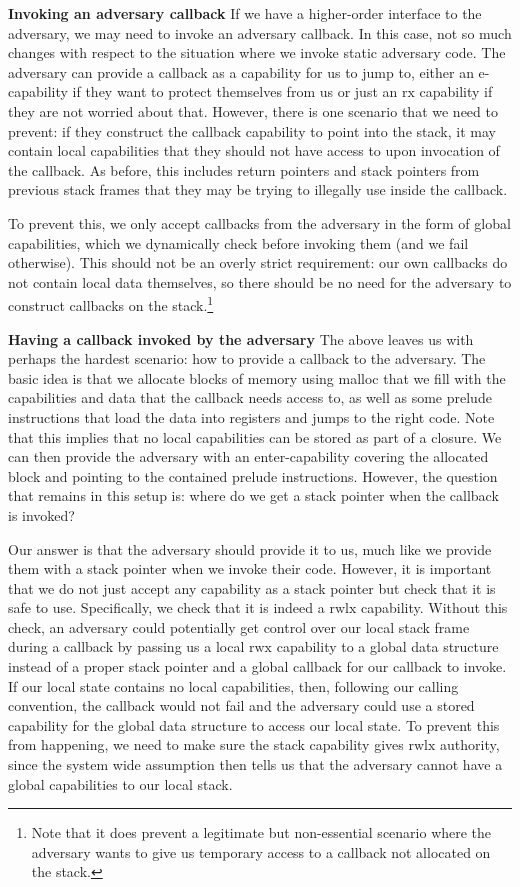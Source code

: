 \documentclass[compsoc,conference,letterpaper,fleqn]{IEEEtran}
\newcommand{\plainperm}[1]{\mathrm{#1}}
\newcommand{\exec}{\plainperm{rx}}
\newcommand{\entry}{\plainperm{e}}
\newcommand{\rwx}{\plainperm{rwx}}
\newcommand{\rwlx}{\plainperm{rwlx}}
\begin{document}
\textbf{Invoking an adversary callback} If we have a higher-order interface to
the adversary, we may need to invoke an adversary callback. In this case, not so
much changes with respect to the situation where we invoke static adversary
code. The adversary can provide a callback as a capability for us to jump to,
either an $\entry$-capability if they want to protect themselves from us or just
an $\exec$ capability if they are not worried about that. However, there is one
scenario that we need to prevent: if they construct the callback capability to
point into the stack, it may contain local capabilities that they should not
have access to upon invocation of the callback. As before, this includes return
pointers and stack pointers from previous stack frames that they may be
trying to illegally use inside the callback.

To prevent this, we only accept callbacks from the adversary in the form of
global capabilities, which we dynamically check before invoking them (and we
fail otherwise). This should not be an overly strict requirement: our own
callbacks do not contain local data themselves, so there should be no need for
the adversary to construct callbacks on the stack.\footnote{Note that it does
  prevent a legitimate but non-essential scenario where the adversary wants to
  give us temporary access to a callback not allocated on the stack.}

\textbf{Having a callback invoked by the adversary} The above leaves us with
perhaps the hardest scenario: how to provide a callback to the adversary. The
basic idea is that we allocate blocks of memory using malloc that we fill with
the capabilities and data that the callback needs access to, as well as some
prelude instructions that load the data into registers and jumps to the right
code. Note that this implies that no local capabilities can be stored as part of
a closure. We can then provide the adversary with an enter-capability covering
the allocated block and pointing to the contained prelude instructions. However,
the question that remains in this setup is: where do we get a stack pointer when
the callback is invoked?

Our answer is that the adversary should provide it to us, much like we provide
them with a stack pointer when we invoke their code. However, it is important
that we do not just accept any capability as a stack pointer but check that it
is safe to use. Specifically, we check that it is indeed a $\rwlx$ capability. Without
this check, an adversary could potentially get control over our local stack
frame during a callback by passing us a local $\rwx$ capability to a global data
structure instead of a proper stack pointer
and a global callback for our callback to invoke. If our local state contains no
local capabilities, then, following our calling convention, the callback would
not fail and the adversary could use a stored capability for the global data
structure to access our local state. To prevent this from happening, we need to
make sure the stack capability gives $\rwlx$ authority, since the system wide assumption then
tells us that the adversary cannot have a global capabilities to our local stack.
\end{document}
